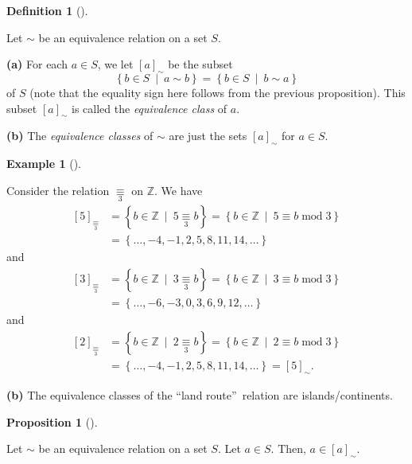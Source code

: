 \documentclass[numbers=enddot,12pt,final,onecolumn,notitlepage]{scrartcl}%
\numberwithin{exer}{subsection}
\theoremstyle{definition}
\newtheorem{prop}[theo]{Proposition}
\newenvironment{proposition}[1][]
{\begin{prop}[#1]\begin{leftbar}}
{\end{leftbar}\end{prop}}
\newtheorem{defi}[theo]{Definition}
\newenvironment{definition}[1][]
{\begin{defi}[#1]\begin{leftbar}}
{\end{leftbar}\end{defi}}
\newtheorem{exam}[theo]{Example}
\newenvironment{example}[1][]
{\begin{exam}[#1]\begin{leftbar}}
{\end{leftbar}\end{exam}}
\begin{document}
\begin{definition}
\label{def.eqrel.eqcl.eqcl}Let $\sim$ be an equivalence relation on a set $S$.

\textbf{(a)} For each $a\in S$, we let $\left[  a\right]  _{\sim}$ be the
subset
\[
\left\{  b\in S\ \mid\ a\sim b\right\}  =\left\{  b\in S\ \mid\ b\sim
a\right\}
\]
of $S$ (note that the equality sign here follows from the previous
proposition). This subset $\left[  a\right]  _{\sim}$ is called the
\textit{equivalence class} of $a$.

\textbf{(b)} The \textit{equivalence classes} of $\sim$ are just the sets
$\left[  a\right]  _{\sim}$ for $a\in S$.
\end{definition}

\begin{example}
\label{exa.eqrel.eqcl.mod3}Consider the relation $\underset{3}{\equiv}$ on
$\mathbb{Z}$. We have%
\begin{align*}
\left[  5\right]  _{\underset{3}{\equiv}}  &  =\left\{  b\in\mathbb{Z}%
\ \mid\ 5\underset{3}{\equiv}b\right\}  =\left\{  b\in\mathbb{Z}%
\ \mid\ 5\equiv b\operatorname{mod}3\right\} \\
&  =\left\{  \ldots,-4,-1,2,5,8,11,14,\ldots\right\}
\end{align*}
and%
\begin{align*}
\left[  3\right]  _{\underset{3}{\equiv}}  &  =\left\{  b\in\mathbb{Z}%
\ \mid\ 3\underset{3}{\equiv}b\right\}  =\left\{  b\in\mathbb{Z}%
\ \mid\ 3\equiv b\operatorname{mod}3\right\} \\
&  =\left\{  \ldots,-6,-3,0,3,6,9,12,\ldots\right\}
\end{align*}
and%
\begin{align*}
\left[  2\right]  _{\underset{3}{\equiv}}  &  =\left\{  b\in\mathbb{Z}%
\ \mid\ 2\underset{3}{\equiv}b\right\}  =\left\{  b\in\mathbb{Z}%
\ \mid\ 2\equiv b\operatorname{mod}3\right\} \\
&  =\left\{  \ldots,-4,-1,2,5,8,11,14,\ldots\right\}  =\left[  5\right]
_{\sim}.
\end{align*}


\textbf{(b)} The equivalence classes of the \textquotedblleft land
route\textquotedblright\ relation are islands/continents.
\end{example}

\begin{proposition}
\label{prop.equiv.eqclas.aina}Let $\sim$ be an equivalence relation on a set
$S$. Let $a\in S$. Then, $a\in\left[  a\right]  _{\sim}$.
\end{proposition}
\end{document}
